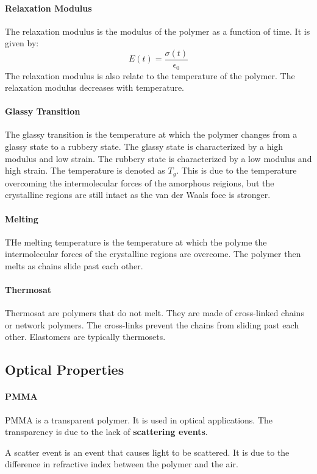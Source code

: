 \documentclass[11pt]{article}
\begin{document}
\paragraph{Relaxation Modulus} The relaxation modulus is the modulus of the polymer as a function of time. It is given by:
\begin{equation}
    E(t) = \frac{\sigma(t)}{\epsilon_0}
\end{equation}
The relaxation modulus is also relate to the temperature of the polymer. The relaxation modulus decreases with temperature.
\paragraph{Glassy Transition} The glassy transition is the temperature at which the polymer changes from a glassy state to a rubbery state. The glassy state is characterized by a high modulus and low strain. The rubbery state is characterized by a low modulus and high strain. The temperature is denoted as $T_g$.
This is due to the temperature overcoming the intermolecular forces of the amorphous reigions, but the crystalline regions are still intact as the van der Waals foce is stronger.
\paragraph{Melting} THe melting temperature is the temperature at which the polyme the intermolecular forces of the crystalline regions are overcome. The polymer then melts as chains slide past each other. 
\paragraph{Thermosat} Thermosat are polymers that do not melt. They are made of cross-linked chains or network polymers. The cross-links prevent the chains from sliding past each other. Elastomers are typically thermosets.
\subsection{Optical Properties}
\paragraph{PMMA} PMMA is a transparent polymer. It is used in optical applications. The transparency is due to the lack of \textbf{scattering events}.
\begin{definition}
    A scatter event is an event that causes light to be scattered. It is due to the difference in refractive index between the polymer and the air.
\end{definition}

\end{document}
